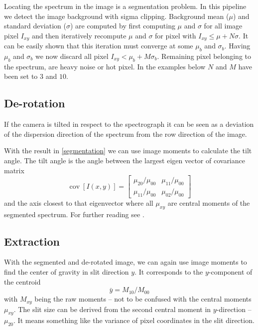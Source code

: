 \documentclass[10pt,a4paper,notitlepage]{article}
\begin{document}
		Locating the spectrum in the image is a segmentation problem.
		In this pipeline we detect the image background with sigma clipping.
		Background mean ($\mu$) and standard deviation ($\sigma$) are computed by first computing $\mu$ and $\sigma$ for all image pixel $I_{xy}$ and then iteratively recompute $\mu$ and $\sigma$ for pixel with $I_{xy} \le \mu + N \sigma$.
		It can be easily shown that this iteration must converge at some $\mu_b$ and $\sigma_b$.
		Having $\mu_b$ and $\sigma_b$ we now discard all pixel $I_{xy} < \mu_b + M \sigma_b$.
		Remaining pixel belonging to the spectrum, are heavy noise or hot pixel.
		In the examples below $N$ and $M$ have been set to $3$ and $10$.

	\subsection{De-rotation}
		\label{derotation}
	
		If the camera is tilted in respect to the spectrograph it can be seen as a deviation of the dispersion direction of the spectrum from the row direction of the image.
		 
		With the result in \ref{segmentation} we can use image moments to calculate the tilt angle.
		The tilt angle is the angle between the largest eigen vector of covariance matrix
		$$\operatorname{cov}[I(x,y)] = \begin{bmatrix} \mu_{20} / \mu_{00} & \mu_{11} / \mu_{00} \\ \mu_{11} / \mu_{00} & \mu_{02} / \mu_{00} \end{bmatrix}$$
		 and the axis closest to that eigenvector where all $\mu_{xy}$ are central moments of the segmented spectrum.
		For further reading see \cite{ImageMoments}.
	
	\subsection{Extraction}
		\label{extraction}
	
		With the segmented and de-rotated image, we can again use image moments to find the center of gravity in slit direction $y$. It corresponds to the $y$-component of the centroid
		$$\bar{y} = M_{10} / M_{00}$$
		with $M_{xy}$ being the raw moments -- not to be confused with the central moments $\mu_{xy}$.
		The slit size can be derived from the second central moment in $y$-direction -- $\mu_{20}$.
		It means something like the variance of pixel coordinates in the slit direction.
		
\end{document}
